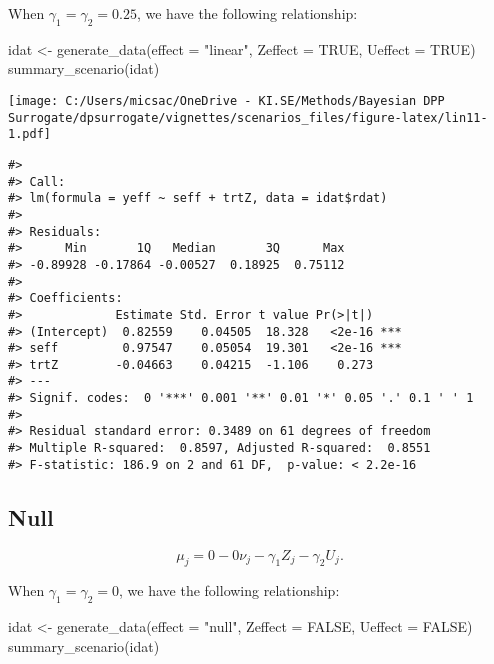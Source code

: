 \documentclass[
]{article}
\newenvironment{Shaded}{\begin{snugshade}}{\end{snugshade}}
\newcommand{\AttributeTok}[1]{\textcolor[rgb]{0.77,0.63,0.00}{#1}}
\newcommand{\ConstantTok}[1]{\textcolor[rgb]{0.00,0.00,0.00}{#1}}
\newcommand{\FunctionTok}[1]{\textcolor[rgb]{0.00,0.00,0.00}{#1}}
\newcommand{\NormalTok}[1]{#1}
\newcommand{\OtherTok}[1]{\textcolor[rgb]{0.56,0.35,0.01}{#1}}
\newcommand{\StringTok}[1]{\textcolor[rgb]{0.31,0.60,0.02}{#1}}
\begin{document}
When \(\gamma_1 = \gamma_2 = 0.25\), we have the following relationship:

\begin{Shaded}
\begin{Highlighting}[]
\NormalTok{idat }\OtherTok{\textless{}{-}} \FunctionTok{generate\_data}\NormalTok{(}\AttributeTok{effect =} \StringTok{"linear"}\NormalTok{, }\AttributeTok{Zeffect =} \ConstantTok{TRUE}\NormalTok{, }\AttributeTok{Ueffect =} \ConstantTok{TRUE}\NormalTok{)}
\FunctionTok{summary\_scenario}\NormalTok{(idat)}
\end{Highlighting}
\end{Shaded}

\texttt{[image: C:/Users/micsac/OneDrive - KI.SE/Methods/Bayesian DPP Surrogate/dpsurrogate/vignettes/scenarios\_files/figure-latex/lin11-1.pdf]}

\begin{verbatim}
#> 
#> Call:
#> lm(formula = yeff ~ seff + trtZ, data = idat$rdat)
#> 
#> Residuals:
#>      Min       1Q   Median       3Q      Max 
#> -0.89928 -0.17864 -0.00527  0.18925  0.75112 
#> 
#> Coefficients:
#>             Estimate Std. Error t value Pr(>|t|)    
#> (Intercept)  0.82559    0.04505  18.328   <2e-16 ***
#> seff         0.97547    0.05054  19.301   <2e-16 ***
#> trtZ        -0.04663    0.04215  -1.106    0.273    
#> ---
#> Signif. codes:  0 '***' 0.001 '**' 0.01 '*' 0.05 '.' 0.1 ' ' 1
#> 
#> Residual standard error: 0.3489 on 61 degrees of freedom
#> Multiple R-squared:  0.8597, Adjusted R-squared:  0.8551 
#> F-statistic: 186.9 on 2 and 61 DF,  p-value: < 2.2e-16
\end{verbatim}

\hypertarget{null}{%
\subsection{Null}\label{null}}

\[\mu_j = 0 - 0 \nu_j - \gamma_1 Z_j - \gamma_2 U_j.\]

When \(\gamma_1 = \gamma_2 = 0\), we have the following relationship:

\begin{Shaded}
\begin{Highlighting}[]
\NormalTok{idat }\OtherTok{\textless{}{-}} \FunctionTok{generate\_data}\NormalTok{(}\AttributeTok{effect =} \StringTok{"null"}\NormalTok{, }\AttributeTok{Zeffect =} \ConstantTok{FALSE}\NormalTok{, }\AttributeTok{Ueffect =} \ConstantTok{FALSE}\NormalTok{)}
\FunctionTok{summary\_scenario}\NormalTok{(idat)}
\end{Highlighting}
\end{Shaded}
\end{document}
